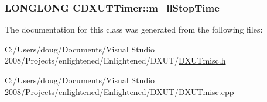 \label{class_c_d_x_u_t_timer_a5d02af56056a52900a24a0b2a4890ebd}
\hypertarget{class_c_d_x_u_t_timer_ad27f97d31ae946f1c0b55ddaa11902cb}{
\subsubsection[{m\_\-llStopTime}]{\setlength{\rightskip}{0pt plus 5cm}LONGLONG {\bf CDXUTTimer::m\_\-llStopTime}}}
\label{class_c_d_x_u_t_timer_ad27f97d31ae946f1c0b55ddaa11902cb}


The documentation for this class was generated from the following files:\begin{DoxyCompactItemize}
\item 
C:/Users/doug/Documents/Visual Studio 2008/Projects/enlightened/Enlightened/DXUT/\hyperlink{_d_x_u_tmisc_8h}{DXUTmisc.h}\item 
C:/Users/doug/Documents/Visual Studio 2008/Projects/enlightened/Enlightened/DXUT/\hyperlink{_d_x_u_tmisc_8cpp}{DXUTmisc.cpp}\end{DoxyCompactItemize}

